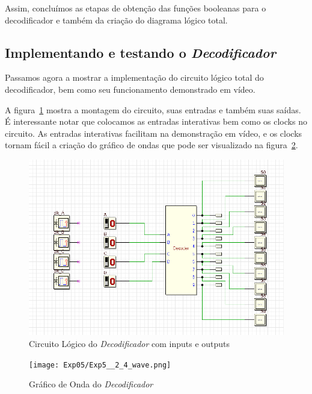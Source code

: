 \documentclass[12pt]{article}
\begin{document}
Assim, concluímos as etapas de obtenção das funções booleanas para o
decodificador e também da criação do diagrama lógico total.

\subsection{Implementando e testando o \emph{Decodificador}}\label{sec:2.4}

Passamos agora a mostrar a implementação do circuito lógico total do
decodificador, bem como seu funcionamento demonstrado em vídeo.

A figura~\ref{fig:Exp5__2_4_circuit.png} mostra a montagem do circuito, suas
entradas e também suas saídas. É interessante notar que colocamos as entradas
interativas bem como os clocks no circuito. As entradas interativas facilitam na
demonstração em vídeo, e os clocks tornam fácil a criação do gráfico de ondas
que pode ser visualizado na figura~\ref{fig:Exp5__2_4_wave.png}.

\begin{figure}[htp]
    \centering
    \includegraphics[width=12cm]{Exp05/Exp5__2_4_circuit.png}
    \caption{Circuito Lógico do \emph{Decodificador} com inputs e outputs}
    \label{fig:Exp5__2_4_circuit.png}
\end{figure}

\begin{figure}[htp]
    \centering
    \texttt{[image: Exp05/Exp5\_\_2\_4\_wave.png]}
    \caption{Gráfico de Onda do \emph{Decodificador}}
    \label{fig:Exp5__2_4_wave.png}
\end{figure}
\end{document}
